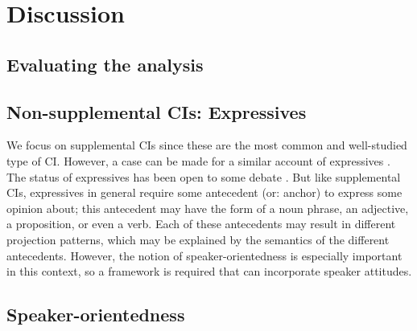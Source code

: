\section{Discussion}

\subsection{Evaluating the analysis}

\subsection{Non-supplemental CIs: Expressives}

We focus on supplemental CIs since these are the most common and
well-studied type of CI.  However, a case can be made for a similar account
of expressives \citep[including expressive attributive adjectives, epithets,
honorifics, and tense-variations such as the German `Konjunktiv I';
cf.][]{potts2005logic}. The status of expressives has been open to some
debate \citep[...]{potts2004japanese,geurts2007fucking}.  But like
supplemental CIs, expressives in general require some antecedent (or:
anchor) to express some opinion about; this antecedent may have the form of
a noun phrase, an adjective, a proposition, or even a verb.
Each of these antecedents may result in different projection patterns, which
may be explained by the semantics of the different antecedents. However,
the notion of speaker-orientedness is especially important in this context,
so a framework is required that can incorporate speaker attitudes.

\subsection{Speaker-orientedness}

